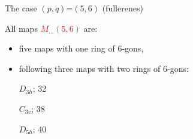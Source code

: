 \documentclass[%
pdf,
colorBG,
slideColor,
]{prosper}
\begin{document}
\begin{slide}{The case $(p,q)$=$(5,6)$ (fullerenes)}

All maps \textcolor{red}{$M_{\dots}(5,6)$} are:
\begin{itemize}
\item five maps with one ring of $6$-gons,
\item following three maps with two rings of $6$-gons:
\begin{center}
\begin{minipage}{35mm}
\centering
{}\par
$D_{3h}$; 32
\end{minipage}
\begin{minipage}{35mm}
\centering
{}\par
$C_{3v}$; 38
\end{minipage}
\begin{minipage}{35mm}
\centering
{}\par
$D_{5h}$; 40
\end{minipage}
\end{center}

\end{itemize}


\end{slide}
\end{document}
